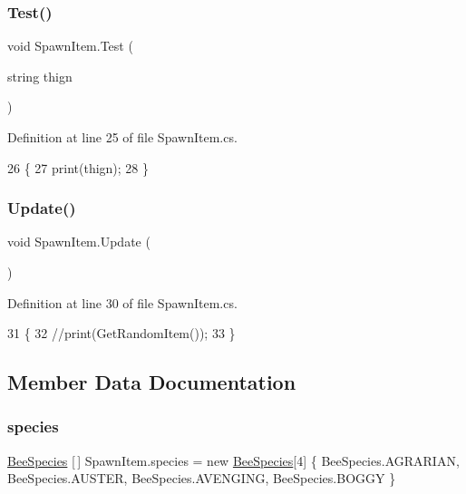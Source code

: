 \subsubsection{\texorpdfstring{Test()}{Test()}}
{\footnotesize\ttfamily void Spawn\+Item.\+Test (\begin{DoxyParamCaption}\item[{string}]{thign }\end{DoxyParamCaption})\hspace{0.3cm}{\ttfamily [private]}}



Definition at line 25 of file Spawn\+Item.\+cs.


\begin{DoxyCode}
26     \{
27         print(thign);
28     \}
\end{DoxyCode}
\mbox{\label{class_spawn_item_a51a14837f0e601a8487541d8ec502db9}} 
\subsubsection{\texorpdfstring{Update()}{Update()}}
{\footnotesize\ttfamily void Spawn\+Item.\+Update (\begin{DoxyParamCaption}{ }\end{DoxyParamCaption})\hspace{0.3cm}{\ttfamily [private]}}



Definition at line 30 of file Spawn\+Item.\+cs.


\begin{DoxyCode}
31     \{
32         \textcolor{comment}{//print(GetRandomItem());}
33     \}
\end{DoxyCode}


\subsection{Member Data Documentation}
\mbox{\label{class_spawn_item_a0af51e744d43adcc6a295222b5d70a6e}} 
\subsubsection{\texorpdfstring{species}{species}}
{\footnotesize\ttfamily \hyperlink{namespace_bee_game_1_1_enums_aa2ead984825678d83c42d48f6382619c}{Bee\+Species} \mbox{[}$\,$\mbox{]} Spawn\+Item.\+species = new \hyperlink{namespace_bee_game_1_1_enums_aa2ead984825678d83c42d48f6382619c}{Bee\+Species}\mbox{[}4\mbox{]} \{ Bee\+Species.\+A\+G\+R\+A\+R\+I\+AN, Bee\+Species.\+A\+U\+S\+T\+ER, Bee\+Species.\+A\+V\+E\+N\+G\+I\+NG, Bee\+Species.\+B\+O\+G\+GY \}\hspace{0.3cm}{\ttfamily [private]}}




